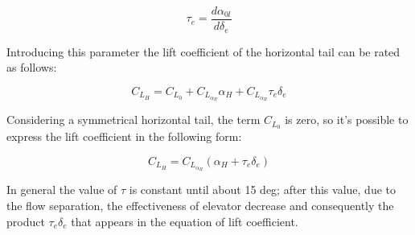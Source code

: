 \begin{equation}		 
\tau_e = \frac{d \alpha_{0l}}{d \delta_e}
\end{equation}

		
Introducing this parameter the lift coefficient of the horizontal tail can be rated as follows:

\begin{equation}
C_{L_H}= C_{L_0} + C_{L_{{\alpha}_H}} \alpha_H + 	C_{L_{{\alpha}_H}} \tau_e \delta_e
\end{equation}

  
Considering a symmetrical horizontal tail, the term $C_{L_0}$ is zero, so it's possible to express the lift coefficient in the following form:


\begin{equation}
C_{L_H}= C_{L_{{\alpha}_H}} \left ( \alpha_H + \tau_e \delta_e \right)
\end{equation}
  		
 In general the value of $\tau$ is constant until about 15 deg; after this value, due to the flow separation, the effectiveness of elevator decrease and consequently the product $ \tau_e \delta_e$ that appears in the equation of lift coefficient.
		


%
%
%

